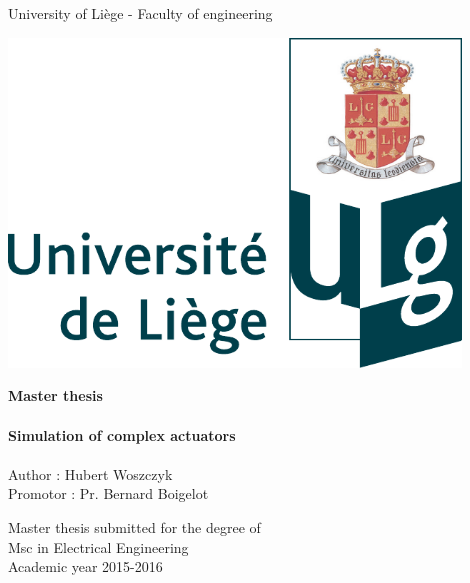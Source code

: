 \begin{titlepage}


\begin{center}
\large
University of Liège - Faculty of engineering
\end{center}

\vfill

\begin{minipage}{0.5\textwidth}
\includegraphics[width=0.9\textwidth]{figures/ULg_logo_couleur.pdf}
\end{minipage}
\begin{minipage}{0.5\textwidth}
\huge
\textbf{Master thesis}\\\\
\normalsize
\textbf{Simulation of complex actuators}\\\\
Author : Hubert Woszczyk\\
Promotor : Pr. Bernard Boigelot\\
\end{minipage}

\vfill
\begin{center}
\large
Master thesis submitted for the degree of\\ 
Msc in Electrical Engineering\\
\vspace*{8cm}
\normalsize
Academic year 2015-2016
\end{center}

\end{titlepage}